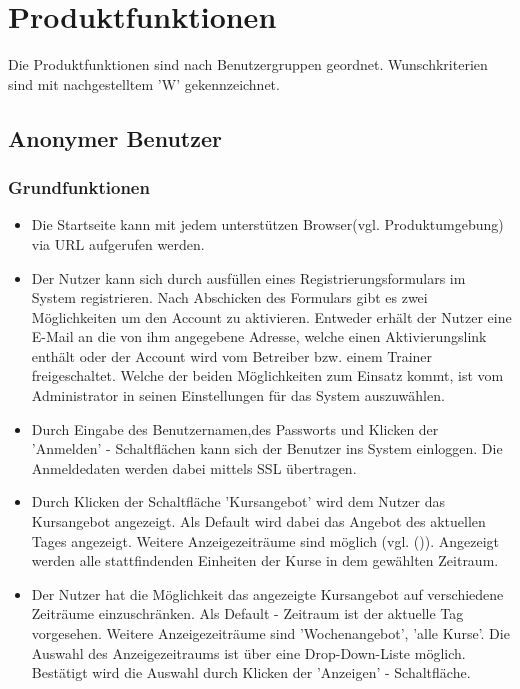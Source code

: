 \documentclass[a4paper]{scrreprt}
\begin{document}
\chapter{Produktfunktionen}
Die Produktfunktionen sind nach Benutzergruppen geordnet. Wunschkriterien sind mit nachgestelltem 'W' gekennzeichnet.

\section{Anonymer Benutzer}
\subsection{Grundfunktionen}
\begin{itemize}
	\item {}
	Die Startseite kann mit jedem unterstützen Browser(vgl. Produktumgebung) via URL aufgerufen werden.
	\item {}
	Der Nutzer kann sich durch ausfüllen eines Registrierungsformulars im System registrieren. Nach Abschicken des Formulars gibt es zwei Möglichkeiten um den Account zu aktivieren. Entweder erhält der Nutzer eine E-Mail an die von ihm angegebene Adresse, welche einen Aktivierungslink enthält oder der Account wird vom Betreiber bzw. einem Trainer freigeschaltet. Welche der beiden Möglichkeiten zum Einsatz kommt, ist vom Administrator in seinen Einstellungen für das System auszuwählen.
	\item {}
	Durch Eingabe des Benutzernamen,des Passworts und Klicken der 'Anmelden' - Schaltflächen kann sich der Benutzer ins System einloggen. Die Anmeldedaten werden dabei mittels SSL übertragen.
	\item {}
	Durch Klicken der Schaltfläche 'Kursangebot' wird dem Nutzer das Kursangebot angezeigt. Als Default wird dabei das Angebot des aktuellen Tages angezeigt. Weitere Anzeigezeiträume sind möglich (vgl. ()). Angezeigt werden alle stattfindenden Einheiten der Kurse in dem gewählten Zeitraum.
	\item {}
	Der Nutzer hat die Möglichkeit das angezeigte Kursangebot auf verschiedene Zeiträume einzuschränken. Als Default - Zeitraum ist der aktuelle Tag vorgesehen. Weitere Anzeigezeiträume sind 'Wochenangebot', 'alle Kurse'. Die Auswahl des Anzeigezeitraums ist über eine Drop-Down-Liste möglich. Bestätigt wird die Auswahl durch Klicken der 'Anzeigen' - Schaltfläche.

\end{itemize}
\end{document}
